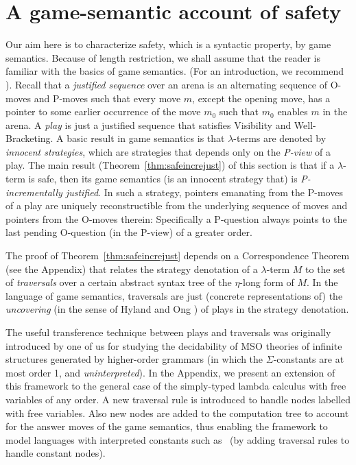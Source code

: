 
\section{A game-semantic account of safety}
\label{sec:gamesemaccount} Our aim here is to characterize safety,
which is a syntactic property, by game semantics. Because of length
restriction, we shall assume that the reader is familiar with the
basics of game semantics.  (For an introduction, we recommend
\cite{abramsky:game-semantics-tutorial}). Recall that a
\emph{justified sequence} over an arena is an alternating sequence
of O-moves and P-moves such that every move $m$, except the opening
move, has a pointer to some earlier occurrence of the move $m_0$
such that $m_0$ enables $m$ in the arena. A \emph{play} is just a
justified sequence that satisfies Visibility and Well-Bracketing. A
basic result in game semantics is that $\lambda$-terms are denoted
by \emph{innocent strategies}, which are strategies that depends
only on the \emph{P-view} of a play. The main result
(Theorem~\ref{thm:safeincrejust}) of this section is that if a
$\lambda$-term is safe, then its game semantics (is an innocent
strategy that) is \emph{P-incrementally justified}. In such a
strategy, pointers emanating from the P-moves of a play are uniquely
reconstructible from the underlying sequence of moves and pointers
from the O-moves therein: Specifically a P-question always points to
the last pending O-question (in the P-view) of a greater order.

The proof of Theorem~\ref{thm:safeincrejust} depends on a
Correspondence Theorem (see the Appendix) that relates the strategy
denotation of a $\lambda$-term $M$ to the set of \emph{traversals}
over a certain abstract syntax tree of the $\eta$-long form of $M$.
In the language of game semantics, traversals are just (concrete
representations of) the \emph{uncovering} (in the sense of Hyland
and Ong \cite{hylandong_pcf}) of plays in the strategy denotation.

The useful transference technique between plays and traversals was
originally introduced by one of us \cite{OngLics2006} for studying
the decidability of MSO theories of infinite structures generated by
higher-order grammars (in which the $\Sigma$-constants are at most
order 1, and \emph{uninterpreted}).
In the Appendix, we present an extension of this framework to the
general case of the simply-typed lambda calculus with free variables
of any order. A new traversal rule is introduced to handle nodes
labelled with free variables. Also new nodes are added to the
computation tree to account for the answer moves of the game
semantics, thus enabling the framework to model languages with
interpreted constants such as \pcf~(by adding traversal rules to
handle constant nodes).


